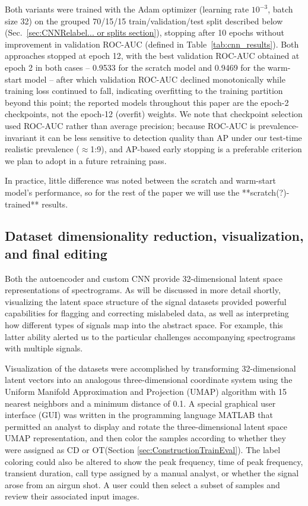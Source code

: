 \documentclass[preprint,NumberedRefs]{JASAnew}
\begin{document}
Both variants were trained with the Adam optimizer (learning rate
$10^{-3}$, batch size 32) on the grouped 70/15/15 train/validation/test
split described below (Sec.~\ref{sec:CNNRelabel... or splits section}),
stopping after 10 epochs without improvement in validation ROC-AUC
(defined in Table~\ref{tab:cnn_results}). Both approaches stopped at
epoch 12, with the best validation ROC-AUC obtained at epoch 2 in both
cases -- 0.9533 for the scratch model and 0.9469 for the warm-start
model -- after which validation ROC-AUC declined monotonically while
training loss continued to fall, indicating overfitting to the training
partition beyond this point; the reported models throughout this paper
are the epoch-2 checkpoints, not the epoch-12 (overfit) weights. We note
that checkpoint selection used ROC-AUC rather than average precision;
because ROC-AUC is prevalence-invariant it can be less sensitive to
detection quality than AP under our test-time realistic prevalence
($\approx$1:9), and AP-based early stopping is a preferable criterion we
plan to adopt in a future retraining pass.

In practice, little difference was noted between the scratch and warm-start model's performance, so for the rest of the paper we will use the **scratch(?)-trained** results.




\subsection{Dataset dimensionality reduction,  visualization, and final editing}
\label{sec:Dataset_Dimen_Vis_Editing}

Both the autoencoder and custom CNN provide 32-dimensional latent space representations of spectrograms.  As will be discussed in more detail shortly, visualizing the latent space structure of the signal datasets provided powerful capabilities for flagging and correcting mislabeled data, as well as interpreting how different types of signals map into the abstract space.  For example, this latter ability alerted us to the particular challenges accompanying spectrograms with multiple signals. 

Visualization of the datasets were accomplished by transforming 32-dimensional latent vectors into an analogous three-dimensional coordinate system using the Uniform Manifold Approximation and Projection (UMAP) algorithm \cite{mcinnes2018umap} with 15 nearest neighbors and a minimum distance of 0.1.  A special graphical user interface (GUI) was written in the programming language MATLAB that permitted an analyst to display and rotate the three-dimensional latent space UMAP representation, and then color the samples according to whether they were assigned as CD or OT(Section \ref{sec:ConstructionTrainEval}).  The label coloring could also be altered to show the peak frequency, time of peak frequency, transient duration, call type assigned by a manual analyst, or whether the signal arose from an airgun shot. A user could then select a subset of samples and review their associated input images. 
\end{document}
